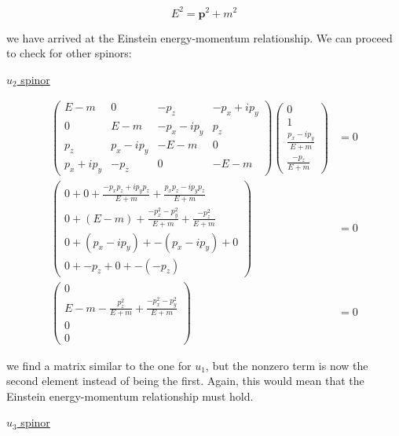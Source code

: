 \documentclass[11pt]{article}
\theoremstyle{definition}
\begin{document}
\begin{equation}
\boxed{
    E^2 = \mathbf{p}^2 + m^2
}
\end{equation}

we have arrived at the Einstein energy-momentum relationship. We can proceed to check for other spinors:

\underline{$u_2$ spinor}

\begin{align}
    \begin{pmatrix}
        E-m & 0 & -p_{z} & - p_{x} + ip_{y}\\
        0 & E-m & - p_{x} - ip_{y} & p_{z}\\
        p_{z} & p_{x} - ip_{y} & -E-m & 0\\
        p_{x} + ip_{y} & -p_{z} & 0 & -E-m
    \end{pmatrix}
    \begin{pmatrix}
        0\\
        1\\
        \frac{p_x - ip_y}{E+m}\\
        \frac{-p_z}{E+m}
    \end{pmatrix}  &= 0\\
    \begin{pmatrix}
        0 + 0 + \frac{-p_xp_z + ip_yp_z}{E+m} + \frac{p_xp_z - ip_yp_z}{E+m}\\
        0 + (E-m) + \frac{-p_{x}^2 - p_{y}^2}{E+m}  + \frac{-p_z^2}{E+m}\\
        0 + (p_x-ip_y) + -(p_x-ip_y) + 0\\
        0 + -p_z + 0 + -(-p_z)
    \end{pmatrix} &= 0\\
    \begin{pmatrix}
        0\\
        E-m - \frac{p_{z}^2}{E+m} + \frac{-p_{x}^2 - p_{y}^2}{E+m}\\
        0\\
        0
    \end{pmatrix}&=0
\end{align}

\begin{mdframed}
    we find a matrix similar to the one for $u_1$, but the nonzero term is now the second element instead of being the first. Again, this would mean that the Einstein energy-momentum relationship must hold.
\end{mdframed}

\underline{$u_3$ spinor}
\end{document}
